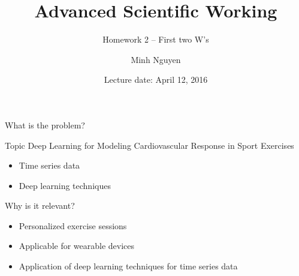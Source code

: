 \documentclass[14pt]{beamer}
\title{Advanced Scientific Working}
\subtitle{Homework 2 -- First two W's}
\date{Lecture date: April 12, 2016}
\author{Minh Nguyen}
\begin{document}
\maketitle

\begin{frame}{What is the problem?}
    \begin{alertblock}{Topic}
        Deep Learning for Modeling Cardiovascular Response in Sport Exercises
        \begin{itemize}
            \item Time series data
            \item Deep learning techniques
        \end{itemize}
    \end{alertblock}
\end{frame}

\begin{frame}{Why is it relevant?}
    \begin{alertblock}{}
        
        \begin{itemize}
            \item Personalized exercise sessions
            \item Applicable for wearable devices
            \item Application of deep learning techniques for time series data
        \end{itemize}
        
    \end{alertblock}
\end{frame}

\end{document}
